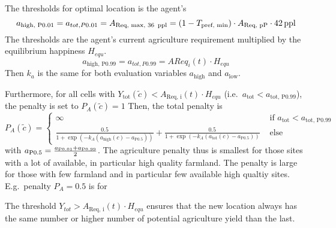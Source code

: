 The thresholds for optimal location is the agent's 
\begin{equation}
a_\text{high, P0.01} = a_{tot, P0.01} =  A_\text{Req, max, 36\, ppl} = (1-T_\text{pref, min})\cdot A_\text{Req, pP} \cdot 42\, {\rm ppl} 
\end{equation}
The thresholds are the agent's current agriculture requirement multiplied by the equilibrium happiness $H_{equ}$.
\begin{equation} 
a_\text{high, P0.99} = a_{tot, P0.99} =  AReq_i(t) \cdot H_{equ}
\end{equation}
Then $k_a$ is the same for both evaluation variables $a_\text{high} $ and $a_\text{low}$.

Furthermore, for all cells with $Y_\text{tot}(\tilde{c})< A_\text{Req, i}(t) \cdot H_{equ}$ (i.e.\ $a_\text{tot} < a_\text{tot, P0.99}$), the penalty is set to $P_A(\tilde{c})=1$ 
Then, the total penalty is 
\begin{equation}
P_{A} (\tilde{c}) = 
\begin{cases} 
\infty & \text{ if } a_\text{tot} < a_\text{tot, P0.99}\\
\frac{0.5}{1+\exp\left( - k_A (a_\text{high}(c)-a_\text{P0.5}) \right)} + \frac{0.5}{1+\exp\left( - k_A (a_\text{tot}(c)-a_\text{P0.5}) \right)} & \text{ else}
\end{cases}
\end{equation}
with $a_\text{P0.5} = \frac{a_{\rm P0.01}+a_{\rm P0.99}}{2}$.
The agriculture penalty thus is smallest for those sites with a lot of available, in particular high quality farmland.
The penalty is large for those with few farmland and in particular few available high qualtiy sites.
E.g.\ penalty $P_A=0.5$ is for 

The threshold $Y_{tot}>A_\text{Req, i}(t) \cdot H_{equ}$ ensures that the new location always has the same number or higher number of potential agriculture yield than the last. 

